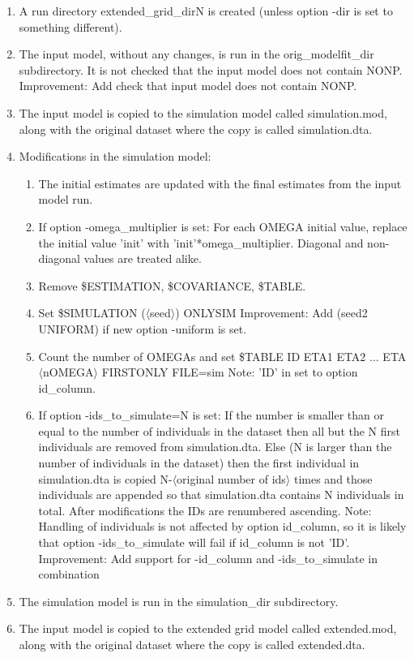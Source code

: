 	\begin{enumerate}
		\item A run directory extended\_grid\_dirN is created (unless option -dir is set to something different).
		\item The input model, without any changes, is run in the orig\_modelfit\_dir subdirectory. It is not checked that the input model does not contain NONP. Improvement: Add check that input model does not contain NONP.
		\item The input model is copied to the simulation model called simulation.mod, along with the original dataset where the copy is called simulation.dta. \newpage										
																						    
		\item Modifications in the simulation model:
		\begin{enumerate}
			\item The initial estimates are updated with the final estimates from the input model run.
			\item If option -omega\_multiplier is set: For each OMEGA initial value, replace the initial value 'init' with 'init'*omega\_multiplier. Diagonal and non-diagonal values are treated alike. 
																				
			\item Remove \$ESTIMATION, \$COVARIANCE, \$TABLE.
			\item Set \$SIMULATION ($\langle$seed$\rangle$) ONLYSIM
			Improvement: Add (seed2 UNIFORM) if new option -uniform is set.
			\item Count the number of OMEGAs and set 
			\$TABLE ID ETA1 ETA2 ... ETA$\langle$nOMEGA$\rangle$ FIRSTONLY FILE=sim
			Note: 'ID' in set to option id\_column.
			\item If option -ids\_to\_simulate=N is set: If the number is smaller than or equal to the number of individuals in the dataset then all but the N first individuals are removed from simulation.dta. Else (N is larger than the number of individuals in the dataset) then the first individual in simulation.dta is copied N-$\langle$original number of ids$\rangle$ times and those individuals are appended so that simulation.dta contains N individuals in total. After modifications the IDs are renumbered ascending. Note: Handling of individuals is not affected by option id\_column, so it is likely that option -ids\_to\_simulate will fail if id\_column is not 'ID'. 
			Improvement: Add support for -id\_column and -ids\_to\_simulate in combination
		\end{enumerate}
		\item The simulation model is run in the simulation\_dir subdirectory.
		\item The input model is copied to the extended grid model called extended.mod, along with the original dataset where the copy is called extended.dta. 
					 

\end{enumerate}
